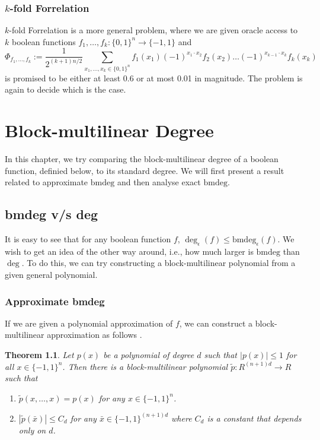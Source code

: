 \documentclass[12pt]{report}
\newtheorem{theorem}{Theorem}
\newcommand{\bmdeg}{\mathrm{bmdeg}}
\begin{document}
\subsection{$k$-fold Forrelation}
$k$-fold Forrelation is a more general problem, where we are given oracle access to $k$ boolean functions $f_1, \ldots, f_k\colon \{0,1\}^n \rightarrow \{-1,1\}$ and
\begin{equation}
\Phi_{f_1, \ldots, f_k} := \frac{1}{2^{(k+1)n/2}} \sum_{x_1, \ldots, x_k \in \{0,1\}^n} f_1(x_1)(-1)^{x_1 \cdot x_2} f_2(x_2) \ldots (-1)^{x_{k-1} \cdot x_k} f_k(x_k)
\end{equation}
is promised to be either at least 0.6 or at most 0.01 in magnitude. The problem is again to decide which is the case.





\chapter{Block-multilinear Degree}
In this chapter, we try comparing the block-multilinear degree of a boolean function, definied below, to its standard degree. We will first present a result related to approximate $\bmdeg$ and then analyse exact $\bmdeg$.


\section{bmdeg v/s deg}
It is easy to see that for any boolean function $f$, $\deg_\epsilon(f) \leq \bmdeg_\epsilon(f)$. We wish to get an idea of the other way around, i.e., how much larger is $\bmdeg$ than $\deg$. To do this, we can try constructing a block-multilinear polynomial from a given general polynomial.

\subsection{Approximate bmdeg}
If we are given a polynomial approximation of $f$, we can construct a block-multilinear approximation as follows \cite{paper2}.

\begin{theorem}
Let $p(x)$ be a polynomial of degree $d$ such that $|p(x)| \leq 1$ for all $x \in \{-1,1\}^{n}$. Then there is a block-multilinear polynomial $\tilde{p}\colon R^{(n+1) d} \rightarrow R$ such that
\begin{enumerate}
    \item $\tilde{p}(x, \ldots, x) = p(x)$ for any $x \in\{-1,1\}^{n}$.
    \item $|\tilde{p}(\bar{x})| \leq C_{d}$ for any $\bar{x} \in\{-1,1\}^{(n+1) d}$ where $C_{d}$ is a constant that depends only on $d$.
\end{enumerate}
\end{theorem}
\end{document}
